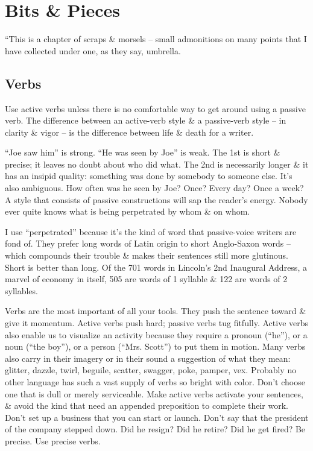 \documentclass{article}
\begin{document}

\section{Bits \& Pieces}
``This is a chapter of scraps \& morsels -- small admonitions on many points that I have collected under one, as they say, umbrella.

\subsection{Verbs}
Use active verbs unless there is no comfortable way to get around using a passive verb. The difference between an active-verb style \& a passive-verb style -- in clarity \& vigor -- is the difference between life \& death for a writer.

``Joe saw him'' is strong. ``He was seen by Joe'' is weak. The 1st is short \& precise; it leaves no doubt about who did what. The 2nd is necessarily longer \& it has an insipid quality: something was done by somebody to someone else. It's also ambiguous. How often was he seen by Joe? Once? Every day? Once a week? A style that consists of passive constructions will sap the reader's energy. Nobody ever quite knows what is being perpetrated by whom \& on whom.

I use ``perpetrated'' because it's the kind of word that passive-voice writers are fond of. They prefer long words of Latin origin to short Anglo-Saxon words -- which compounds their trouble \& makes their sentences still more glutinous. Short is better than long. Of the 701 words in Lincoln's 2nd Inaugural Address, a marvel of economy in itself, 505 are words of 1 syllable \& 122 are words of 2 syllables.

Verbs are the most important of all your tools. They push the sentence toward \& give it momentum. Active verbs push hard; passive verbs tug fitfully. Active verbs also enable us to visualize an activity because they require a pronoun (``he''), or a noun (``the boy''), or a person (``Mrs. Scott'') to put them in motion. Many verbs also carry in their imagery or in their sound a suggestion of what they mean: glitter, dazzle, twirl, beguile, scatter, swagger, poke, pamper, vex. Probably no other language has such a vast supply of verbs so bright with color. Don't choose one that is dull or merely serviceable. Make active verbs activate your sentences, \& avoid the kind that need an appended preposition to complete their work. Don't set up a business that you can start or launch. Don't say that the president of the company stepped down. Did he resign? Did he retire? Did he get fired? Be precise. Use precise verbs.
\end{document}
